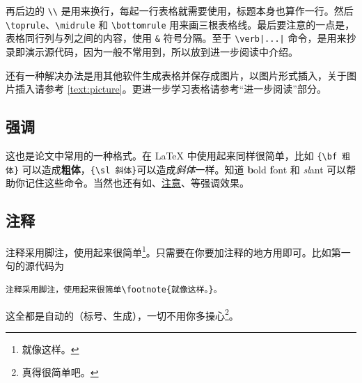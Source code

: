 再后边的 \verb|\\| 是用来换行，每起一行表格就需要使用，标题本身也算作一行。然后 \verb|\toprule|、\verb|\midrule| 和 \verb|\bottomrule| 用来画三根表格线。最后要注意的一点是，表格同行列与列之间的内容，使用 \verb|&| 符号分隔。至于 \verb+\verb|...|+ 命令，是用来抄录即演示源代码，因为一般不常用到，所以放到进一步阅读中介绍。

还有一种解决办法是用其他软件生成表格并保存成图片，以图片形式插入，关于图片插入请参考 \ref{text:picture}。更进一步学习表格请参考“进一步阅读”部分。

\subsection{强调}
这也是论文中常用的一种格式。在 LaTeX 中使用起来同样很简单，比如 \verb|{\bf 粗体}| 可以造成{\bf 粗体}，\verb|{\sl 斜体}|可以造成{\sl 斜体}一样。知道 {\bf b}old {\bf f}ont 和 {\sl sl}ant 可以帮助你记住这些命令。当然也还有如、\uline{注意}、等强调效果。

\subsection{注释}
注释采用脚注，使用起来很简单\footnote{就像这样。}。只需要在你要加注释的地方用即可。比如第一句的源代码为
\begin{Verbatim}[frame=single]
注释采用脚注，使用起来很简单\footnote{就像这样。}。
\end{Verbatim}
这全都是自动的（标号、生成），一切不用你多操心\footnote{真得很简单吧。}。

